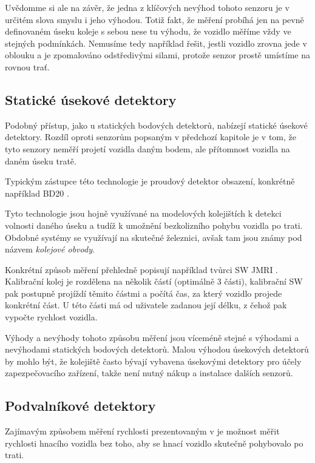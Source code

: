 \documentclass[12pt,a4paper]{article}
\begin{document}
Uvědomme si ale na závěr, že jedna z klíčových nevýhod tohoto senzoru je v
určitém slova smyslu i jeho výhodou. Totiž fakt, že měření probíhá jen na pevně
definovaném úseku koleje s sebou nese tu výhodu, že vozidlo měříme vždy ve
stejných podmínkách. Nemusíme tedy například řešit, jestli vozidlo zrovna jede
v oblouku a je zpomalováno odstředivými silami, protože senzor prostě umístíme
na rovnou trať.

\subsection{Statické úsekové detektory}

Podobný přístup, jako u statických bodových detektorů, nabízejí statické úsekové
detektory. Rozdíl oproti senzorům popsaným v předchozí kapitole je v tom, že
tyto senzory neměří projetí vozidla daným bodem, ale přítomnost vozidla na daném
úseku tratě.

Typickým zástupce této technologie je proudový detektor obsazení, konkrétně
například BD20 \cite{bd20}.

Tyto technologie jsou hojně využívané na modelových kolejištích k detekci
volnosti daného úseku a tudíž k umožnění bezkolizního pohybu vozidla po trati.
Obdobné systémy se využívají na skutečné železnici, avšak tam jsou známy pod
názvem \textit{kolejové obvody}.

Konkrétní způsob měření přehledně popisují například tvůrci SW JMRI
\cite{jmri:speedometer}.
Kalibrační kolej je rozdělena na několik částí (optimálně 3 části), kalibrační
SW pak postupně projíždí těmito částmi a počítá čas, za který vozidlo projede
konkrétní část. U této části má od uživatele zadanou její délku, z čehož pak
vypočte rychlost vozidla.

Výhody a nevýhody tohoto způsobu měření jsou víceméně stejné s výhodami a
nevýhodami statických bodových detektorů. Malou výhodou úsekových detektorů by
mohlo být, že kolejiště často bývají vybavena úsekovými detektory pro účely
zapezpečovacího zařízení, takže není nutný nákup a instalace dalších senzorů.

\subsection{Podvalníkové detektory}

Zajímavým způsobem měření rychlosti prezentovaným v \cite{bachrus}
je možnost měřit rychlosti hnacího vozidla bez toho, aby se hnací vozidlo
skutečně pohybovalo po trati.
\end{document}
